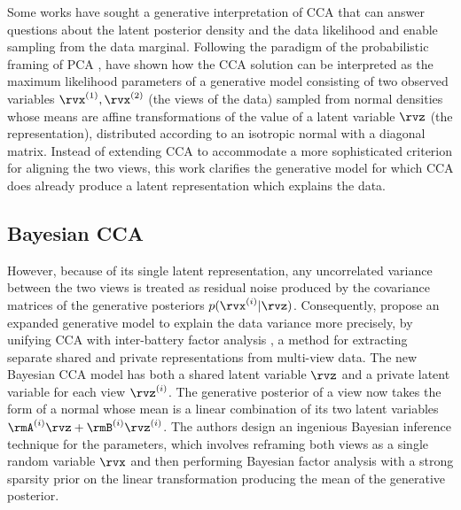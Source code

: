 \documentclass[withindex,glossary,firstyr,times]{cam-thesis}
\begin{document}
Some works have sought a generative interpretation of CCA that can answer questions about the latent posterior density and the data likelihood and enable sampling from the data marginal. Following the paradigm of the probabilistic framing of PCA \cite{tipping1999probabilistic}, \citet{bach2005probabilistic} have shown how the CCA solution can be interpreted as the maximum likelihood parameters of a generative model consisting of two observed variables $\rvx^{(1)}, \rvx^{(2)}$ (the views of the data) sampled from normal densities whose means are affine transformations of the value of a latent variable $\rvz$ (the representation), distributed according to an isotropic normal with a diagonal matrix. Instead of extending CCA to accommodate a more sophisticated criterion for aligning the two views, this work clarifies the generative model for which CCA does already produce a latent representation which explains the data.

\subsection{Bayesian CCA}

However, because of its single latent representation, any uncorrelated variance between the two views is treated as residual noise produced by the covariance matrices of the generative posteriors $p(\rvx^{(i)} | \rvz)$. Consequently, \citet{klami2013bayesian} propose an expanded generative model to explain the data variance more precisely, by unifying CCA with inter-battery factor analysis \cite{tucker1958inter, browne1979maximum}, a method for extracting separate shared and private representations from multi-view data. The new Bayesian CCA model has both a shared latent variable $\rvz$ and a private latent variable for each view $\rvz^{(i)}$. The generative posterior of a view now takes the form of a normal whose mean is a linear combination of its two latent variables $\rmA^{(i)} \rvz + \rmB^{(i)} \rvz^{(i)}$. The authors design an ingenious Bayesian inference technique for the parameters, which involves reframing both views as a single random variable $\rvx$ and then performing Bayesian factor analysis \cite{ghahramani2000variational} with a strong sparsity prior on the linear transformation producing the mean of the generative posterior. 
\end{document}
